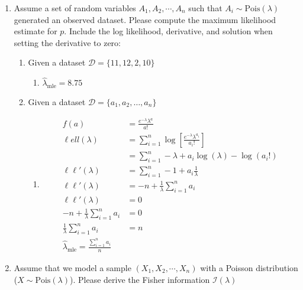 \documentclass[krantz1,ChapterTOCs]{krantz}
\begin{document}
\begin{enumerate}
\begin{enumerate}
\begin{enumerate}
{            }
        \end{enumerate}
    \end{enumerate}
    
    \item Assume a set of random variables $A_{1}, A_{2}, \cdots, A_{n}$ such that $A_{i} \sim \text{Pois}(\lambda)$ generated an observed dataset. Please compute the maximum likelihood estimate for $p$. Include the log likelihood, derivative, and solution when setting the derivative to zero: 
    \begin{enumerate}
        \item Given a dataset $\mathcal{D} = \{ 11,12,2,10 \}$
        
        \begin{enumerate}
            \item { \color{red}  $\hat{\lambda}_{\text{mle}} = 8.75$ }
        \end{enumerate}
        \item Given a dataset $\mathcal{D} = \{a_{1}, a_{2}, \dots, a_{n}\}$
        
        \begin{enumerate}
            \item { \color{red} 
            \begin{align}
                f(a) &= \frac{e^{-\lambda} \lambda ^{a} }{a!}\\
                \ell ell (\lambda) &= \sum_{i=1}^{n} \log \left[\frac{e^{-\lambda} \lambda ^{a_{i}} }{a_{i}!} \right] \\
                &= \sum_{i=1}^{n} -\lambda + a_{i} \log(\lambda) - \log(a_{i}!)\\
                \ell \ell ' (\lambda) &= \sum_{i=1}^{n} -1 + a_{i} \frac{1}{\lambda} \\
                \ell \ell ' (\lambda) &=  -n + \frac{1}{\lambda}\sum_{i=1}^{n}a_{i} \\
                \ell \ell ' (\lambda) &= 0 \\ 
                -n + \frac{1}{\lambda}\sum_{i=1}^{n}a_{i} &= 0 \\
                \frac{1}{\lambda}\sum_{i=1}^{n}a_{i} &= n \\
                \hat{\lambda}_{\text{mle}} = \frac{\sum_{i=1}^{n}a_{i}}{n}
            \end{align}
            }
        \end{enumerate}
    \end{enumerate}

    \item Assume that we model a sample $(X_{1},X_{2},\cdots,X_{n})$ with a Poisson distribution ($X \sim \text{Pois}(\lambda)$). Please derive the Fisher information $\mathcal{I}(\lambda)$ 
        

\end{enumerate}
\end{document}

